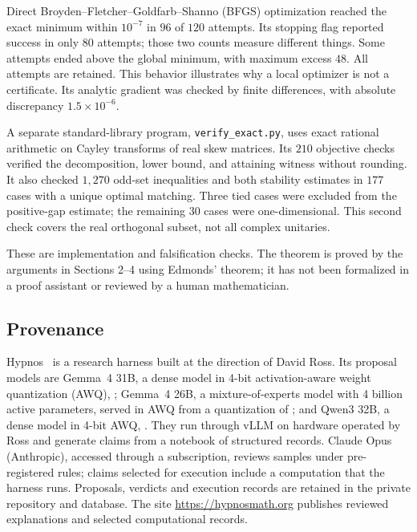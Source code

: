 \documentclass[11pt]{article}
\begin{document}
Direct Broyden--Fletcher--Goldfarb--Shanno (BFGS) optimization reached the exact minimum within $10^{-7}$
in $96$ of $120$ attempts. Its stopping flag reported success in only
$80$ attempts; those two counts measure different things. Some attempts
ended above the global minimum, with maximum excess $48$. All attempts
are retained. This behavior illustrates why a local optimizer is not a
certificate. Its analytic gradient was checked by finite differences,
with absolute discrepancy $1.5\times10^{-6}$.

A separate standard-library program, \texttt{verify\_exact.py}, uses
exact rational arithmetic on Cayley transforms of real skew matrices.
Its $210$ objective checks verified the decomposition, lower bound, and
attaining witness without rounding. It also checked $1{,}270$ odd-set
inequalities and both stability estimates in $177$ cases with a unique
optimal matching. Three tied cases were excluded from the positive-gap
estimate; the remaining $30$ cases were one-dimensional. This second
check covers the real orthogonal subset, not all complex unitaries.

These are implementation and falsification checks. The theorem is proved
by the arguments in Sections 2--4 using Edmonds' theorem; it has not been
formalized in a proof assistant or reviewed by a human mathematician.

\subsection{Provenance}

Hypnos~\cite{HypnosMethods} is a research harness built at the direction of David Ross. Its proposal models are Gemma~4 31B, a dense model in 4-bit activation-aware weight quantization (AWQ), ; Gemma~4 26B, a mixture-of-experts model with 4 billion active parameters, served in AWQ from a quantization of ; and Qwen3 32B, a dense model in 4-bit AWQ, . They run through vLLM on hardware operated by Ross and generate claims from a notebook of structured records. Claude Opus (Anthropic), accessed through a subscription, reviews samples under pre-registered rules; claims selected for execution include a computation that the harness runs. Proposals, verdicts and execution records are retained in the private repository and database. The site \url{https://hypnosmath.org} publishes reviewed explanations and selected computational records.
\end{document}
